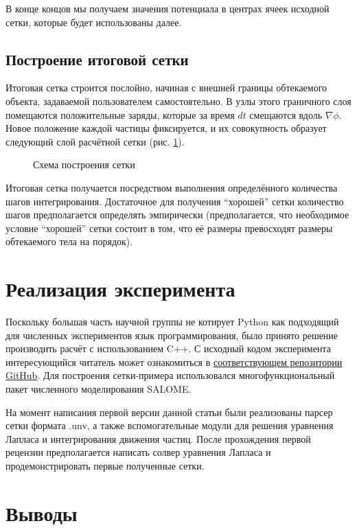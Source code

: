 \documentclass[a4paper,12pt]{article}
\begin{document}
В конце концов мы получаем значения потенциала в центрах ячеек исходной сетки, которые будет использованы далее.

\subsection{Построение итоговой сетки}

Итоговая сетка строится послойно, начиная с внешней границы обтекаемого объекта, задаваемой пользователем самостоятельно. В узлы этого граничного слоя помещаются положительные заряды, которые за время $dt$ смещаются вдоль $\nabla \phi$. Новое положение каждой частицы фиксируется, и их совокупность образует следующий слой расчётной сетки (рис. \ref{fig:схема построения сетки}).

\begin{figure}[htbp]
    \centering
    
    \caption{Схема построения сетки}
    \label{fig:схема построения сетки}
\end{figure}

Итоговая сетка получается посредством выполнения определённого количества шагов интегрирования. Достаточное для получения “хорошей” сетки количество шагов предполагается определять эмпирически (предполагается, что необходимое условие “хорошей” сетки состоит в том, что её размеры превосходят размеры обтекаемого тела на порядок).

\section{Реализация эксперимента}

Поскольку большая часть научной группы не котирует Python как подходящий для численных экспериментов язык программирования, было принято решение производить расчёт с использованием C++. С исходный кодом эксперимента интересующийся читатель может ознакомиться в \href{https://github.com/d-qql/FlowMeshBuilder}{соответствующем репозитории GitHub}. Для построения сетки-примера использовался многофункциональный пакет численного моделирования SALOME.

На момент написания первой версии данной статьи были реализованы парсер сетки формата .unv, а также вспомогательные модули для решения уравнения Лапласа и интегрирования движения частиц. После прохождения первой рецензии предполагается написать солвер уравнения Лапласа и продемонстрировать первые полученные сетки.

\section{Выводы}
\end{document}
